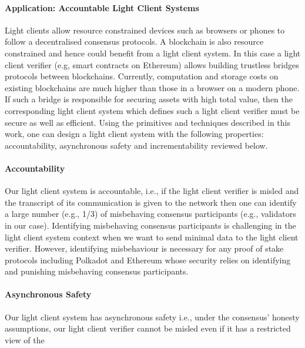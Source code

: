 \paragraph{Application: Accountable Light Client Systems} %
Light clients allow resource constrained devices such as browsers or phones to follow a decentralised consensus protocols. A blockchain is also resource constrained and hence could benefit from a light client system. In this case a light client verifier (e.g, smart contracts on
Ethereum) allows building trustless bridges protocols between blockchains. %
Currently, computation and storage
costs on existing blockchains are much higher than those in a browser on a modern phone. If such a bridge is responsible for securing assets with high total value, then the corresponding light client system which defines such a light client verifier must be secure as well as efficient. Using the primitives and techniques described in this work, one can design a light client system with the following properties: accountability, asynchronous safety and incrementability reviewed below.  \vspace{-0.2cm}
\noindent\paragraph{Accountability}Our light client system is accountable, i.e., if the light client verifier is misled and the transcript of its communication is given to the network then one can identify a large
number (e.g., 1/3) of misbehaving consensus participants (e.g., validators in our case). Identifying misbehaving consensus participants
is challenging in the light client system context when we want to send minimal data to the light client verifier. However,
identifying misbehaviour is necessary for any proof of stake protocols including Polkadot and Ethereum whose security relies on identifying and punishing misbehaving consensus participants.
\vspace{-0.2cm}
\noindent\paragraph{Asynchronous Safety}Our light client system has asynchronous safety i.e., under the consensus' honesty assumptions, our light client verifier cannot be misled even if it has a restricted view of the
